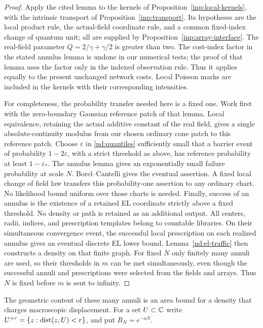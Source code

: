 \begin{proof}
Apply the cited lemma to the kernels of
Proposition~\ref{inp:local-kernels}, with the intrinsic transport
of Proposition~\ref{inp:transport}.  Its hypotheses are the local
product rule, the actual-field coordinate rule, and a common
fixed-index change of quantum unit; all are supplied by
Proposition~\ref{inp:array-interface}.  The real-field parameter
$Q=2/\gamma+\gamma/2$ is greater than two.  The cost-index factor
in the stated annulus lemma is undone in our numerical tests;
the proof of that lemma uses the factor only in the indexed
observation rule.  Thus it applies equally to the present
unchanged network costs.  Local Poisson marks are included in
the kernels with their corresponding intensities.

For completeness, the probability transfer needed here is a fixed
one.  Work first with the zero-boundary Gaussian reference patch
of that lemma.  Local equivalence, retaining the actual additive
constant of the real field, gives a single absolute-continuity
modulus from our chosen ordinary cone patch to this reference
patch.  Choose $\varepsilon$ in \eqref{nd:quantiles} sufficiently
small that a barrier event of probability $1-2\varepsilon$,
with a strict threshold as above, has reference probability at
least $1-\varepsilon_*$.  The annulus lemma gives an exponentially
small failure probability at scale $N$.  Borel--Cantelli gives
the eventual assertion.  A fixed local change of field law
transfers this probability-one assertion to any ordinary chart.
No likelihood bound uniform over those charts is needed.
Finally, success of an annulus is the existence of a retained
EL coordinate strictly above a fixed threshold.  No density or
path is retained as an additional output.  All centers, radii,
indices, and prescription templates belong to countable
libraries.  On their simultaneous convergence event, the
successful local prescription on each realized annulus gives
an eventual discrete EL lower bound.  Lemma~\ref{nd:el-traffic}
then constructs a density on that finite graph.  For fixed $N$
only finitely many annuli are used, so their thresholds in $m$
can be met simultaneously, even though the successful annuli
and prescriptions were selected from the fields and arrays.
Thus $N$ is fixed before $m$ is sent to infinity.
\end{proof}

The geometric content of these many annuli is an area bound for a
density that charges macroscopic displacement.  For a set $U\subset\mathbb C$
write $U^{+r}=\{z:\operatorname{dist}(z,U)<r\}$, and put $R_N=e^{-aN}$.

